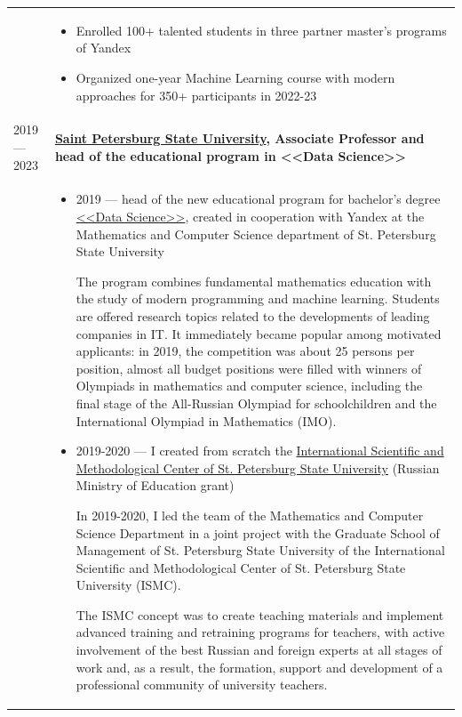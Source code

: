 \documentclass[11pt]{article}
\begin{document}
\begin{longtable} {l | p{}}
& \vspace{-1.5em}
	\begin{itemize}
		\item Enrolled 100+ talented students in three partner master's programs of Yandex
		\item Organized one-year Machine Learning course with modern approaches for 350+ participants in 2022-23
	\end{itemize} \\
2019 — 2023 & {\textbf{\href{https://english.spbu.ru/}{Saint Petersburg State University}, Associate Professor and head of the educational program in <<Data Science>>}} \\
& \vspace{-1.5em}
\begin{itemize}
\item 2019 — head of the new educational program for bachelor's degree \href{https://maad.compscicenter.ru}{<<Data Science>>}, created in cooperation with Yandex at the Mathematics and Computer Science department of St. Petersburg State University

  The program combines fundamental mathematics education with the study of modern programming and machine learning. Students are offered research topics related to the developments of leading companies in IT. It immediately became popular among motivated applicants: in 2019, the competition was about 25 persons per position, almost all budget positions were filled with winners of Olympiads in mathematics and computer science, including the final stage of the All-Russian Olympiad for schoolchildren and the International Olympiad in Mathematics (IMO).
\item 2019-2020 — I created from scratch the \href{https://gsom.spbu.ru/all_news/event2020-11-28/}{International Scientific and Methodological Center of St. Petersburg State University} (Russian Ministry of Education grant)

  In 2019-2020, I led the team of the Mathematics and Computer Science Department in a joint project with the Graduate School of Management of St. Petersburg State University of the International Scientific and Methodological Center of St. Petersburg State University (ISMC).

  The ISMC concept was to create teaching materials and implement advanced training and retraining programs for teachers, with active involvement of the best Russian and foreign experts at all stages of work and, as a result, the formation, support and development of a professional community of university teachers.


\end{itemize}
\end{longtable}
\end{document}
